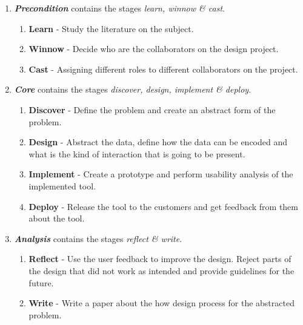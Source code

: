 \documentclass[paper=a4, fontsize=11pt]{scrartcl}
\numberwithin{equation}{section} %
\numberwithin{figure}{section} %
\numberwithin{table}{section} %
\begin{document}
\begin{enumerate}
\item \textit{\textbf{Precondition}} contains the stages \textit{learn, winnow \& cast}.
         	\begin{enumerate}
	\item {\textbf{Learn}} - Study the literature on the subject.
	\item {\textbf{Winnow}} - Decide who are the collaborators on the design project.
	\item {\textbf{Cast}} - Assigning different roles to different collaborators on the project.
	\end{enumerate}
\item \textit{\textbf{Core}} contains the stages \textit{discover, design, implement \& deploy}.
         	\begin{enumerate}
	\item {\textbf{Discover}} - Define the problem and create an abstract form of the problem.
	\item {\textbf{Design}} - Abstract the data, define how the data can be encoded and what is the kind of interaction that is going to be present.
	\item {\textbf{Implement}} - Create a prototype and perform usability analysis of the implemented tool.
	\item {\textbf{Deploy}} - Release the tool to the customers and get feedback from them about the tool.
	\end{enumerate}
\item \textit{\textbf{Analysis}} contains the stages \textit{reflect \& write}.
         	\begin{enumerate}
	\item {\textbf{Reflect}} - Use the user feedback to improve the design. Reject parts of the design that did not work as intended and provide guidelines for the future.
	\item {\textbf{Write}} - Write a paper about the how design process for the abstracted problem.
	\end{enumerate}
\end{enumerate}
\end{document}
